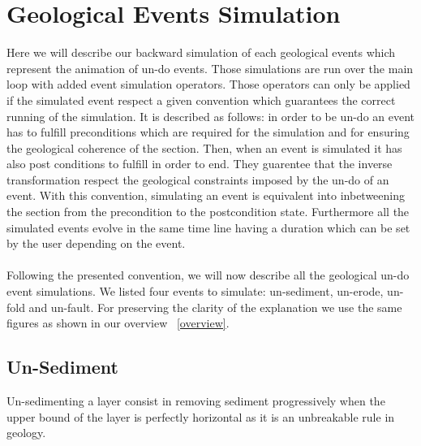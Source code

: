 \documentclass[12pt, a4paper]{report} %
\begin{document}
\section{Geological Events Simulation}
\label{sec:geoevsim}
Here we will describe our backward simulation of each geological events which represent the animation of un-do events. Those simulations are run over the main loop with added event simulation operators. Those operators can only be applied if the simulated event respect a given convention which guarantees the correct running of the simulation. It is described as follows: in order to be un-do an event has to fulfill preconditions which are required for the simulation and for ensuring the geological coherence of the section. Then, when an event is simulated it has also post conditions to fulfill in order to end. They guarentee that the inverse transformation respect the geological constraints imposed by the un-do of an event. With this convention, simulating an event is equivalent into inbetweening the section from the precondition to the postcondition state. Furthermore all the simulated events evolve in the same time line having a duration which can be set by the user depending on the event.\\\\
Following the presented convention, we will now describe all the geological un-do event simulations. We listed four events to simulate: un-sediment, un-erode, un-fold and un-fault. For preserving the clarity of the explanation we use the same figures as shown in our overview ~\ref{overview}.

\subsection{Un-Sediment}
\label{sub:unsed}
Un-sedimenting a layer consist in removing sediment progressively when the upper bound of the layer is perfectly horizontal as it is an unbreakable rule in geology.\\\\
\end{document}
